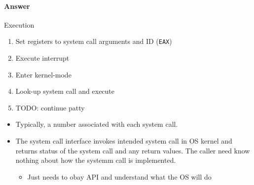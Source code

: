 \paragraph{Answer}
Execution
\begin{enumerate}
  \item Set registers to system call arguments and ID (\texttt{EAX})
  \item Execute interrupt
  \item Enter kernel-mode
  \item Look-up system call and execute
  \item TODO: continue patty
\end{enumerate}

\begin{itemize}
  \item Typically, a number associated with each system call.
  \item The system call interface invokes intended system call in OS kernel and returns status of the system call and any return values.
  The caller need know nothing about how the systemm call is implemented.
  \begin{itemize}
    \item Just needs to obay API and understand what the OS will do
  \end{itemize}
\end{itemize}
